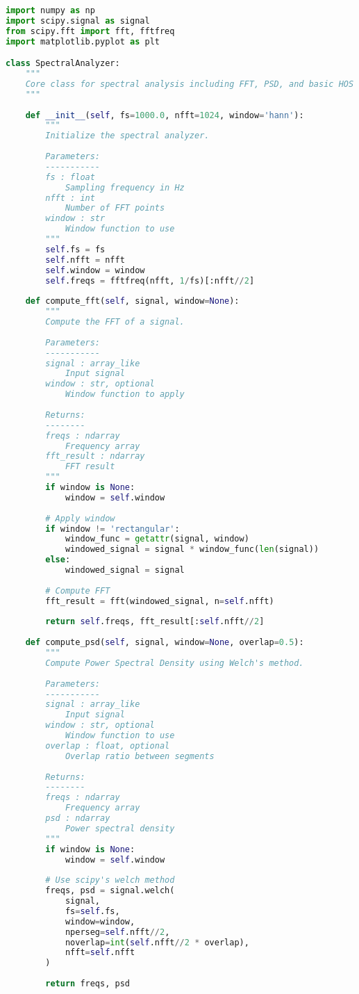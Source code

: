 \begin{lstlisting}[language=Python, caption=Core SpectralAnalyzer class implementation]
import numpy as np
import scipy.signal as signal
from scipy.fft import fft, fftfreq
import matplotlib.pyplot as plt

class SpectralAnalyzer:
    """
    Core class for spectral analysis including FFT, PSD, and basic HOS analysis.
    """
    
    def __init__(self, fs=1000.0, nfft=1024, window='hann'):
        """
        Initialize the spectral analyzer.
        
        Parameters:
        -----------
        fs : float
            Sampling frequency in Hz
        nfft : int
            Number of FFT points
        window : str
            Window function to use
        """
        self.fs = fs
        self.nfft = nfft
        self.window = window
        self.freqs = fftfreq(nfft, 1/fs)[:nfft//2]
        
    def compute_fft(self, signal, window=None):
        """
        Compute the FFT of a signal.
        
        Parameters:
        -----------
        signal : array_like
            Input signal
        window : str, optional
            Window function to apply
            
        Returns:
        --------
        freqs : ndarray
            Frequency array
        fft_result : ndarray
            FFT result
        """
        if window is None:
            window = self.window
            
        # Apply window
        if window != 'rectangular':
            window_func = getattr(signal, window)
            windowed_signal = signal * window_func(len(signal))
        else:
            windowed_signal = signal
            
        # Compute FFT
        fft_result = fft(windowed_signal, n=self.nfft)
        
        return self.freqs, fft_result[:self.nfft//2]
    
    def compute_psd(self, signal, window=None, overlap=0.5):
        """
        Compute Power Spectral Density using Welch's method.
        
        Parameters:
        -----------
        signal : array_like
            Input signal
        window : str, optional
            Window function to use
        overlap : float, optional
            Overlap ratio between segments
            
        Returns:
        --------
        freqs : ndarray
            Frequency array
        psd : ndarray
            Power spectral density
        """
        if window is None:
            window = self.window
            
        # Use scipy's welch method
        freqs, psd = signal.welch(
            signal, 
            fs=self.fs, 
            window=window, 
            nperseg=self.nfft//2,
            noverlap=int(self.nfft//2 * overlap),
            nfft=self.nfft
        )
        
        return freqs, psd
\end{lstlisting}

